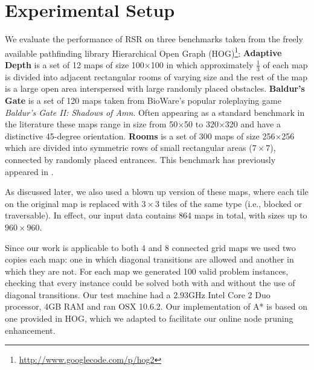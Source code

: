 \section{Experimental Setup}
We evaluate the performance of RSR on three benchmarks taken from
the freely available pathfinding library 
Hierarchical Open Graph (HOG)\footnote{\url{http://www.googlecode.com/p/hog2}}:
{\textbf{Adaptive Depth} is a set of 12 maps of size 100$\times$100 in which approximately
$\frac{1}{3}$ of each map is divided into adjacent rectangular rooms of
varying size and the rest of the map is a large open area interspersed with 
large randomly placed obstacles.}
{\textbf{Baldur's Gate} is a set of 120 maps taken from BioWare's popular
roleplaying game \emph{Baldur's Gate II: Shadows of Amn}. 
Often appearing as a standard benchmark in the literature 
\cite{botea04,sturtevant05,bjornsson06,harabor10,pochter10} these maps range in 
size from 50$\times$50 to 320$\times$320 and have a distinctive 45-degree orientation.}
{\textbf{Rooms} is a set of 300 maps of size 256$\times$256 which are
divided into symmetric rows of small rectangular areas ($7\times7$), connected
by randomly placed entrances. This benchmark has previously appeared in
\cite{pochter10}.}

As discussed later, we also used a blown up version of these maps,
where each tile on the original map is replaced with $3\times3$ tiles of the same type
(i.e., blocked or traversable). In effect, our input data contains 864 maps in total,
with sizes up to $960\times960$.

Since our work is applicable to both 4 and 8 connected grid maps we used two
copies each map: one in which diagonal transitions are allowed and another
in which they are not.
For each map we generated 100 valid problem instances, checking that every
instance could be solved both with and without the use of diagonal
transitions.
%
Our test machine had a 2.93GHz Intel Core 2 Duo processor, 4GB RAM and
ran OSX 10.6.2.
Our implementation of A* is based on one provided in HOG, which we adapted to
facilitate our online node pruning enhancement.
